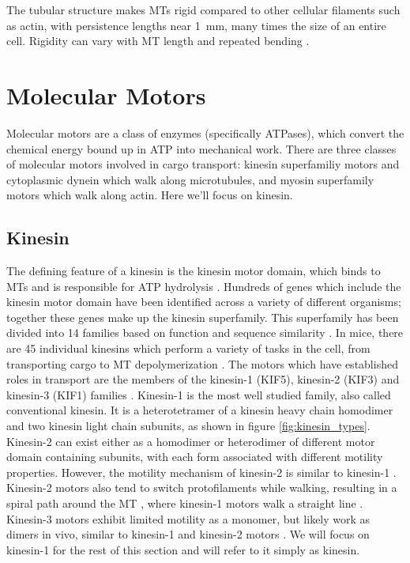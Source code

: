 The tubular structure makes MTs rigid compared to other cellular filaments such as actin, with persistence lengths near \SI{1}{\milli\meter}, many times the size of an entire cell. Rigidity can vary with MT length and repeated bending \cite{Schaedel2015}.

\section{Molecular Motors}

Molecular motors are a class of enzymes (specifically ATPases), which convert the chemical energy bound up in ATP into mechanical work. There are three classes of molecular motors involved in cargo transport: kinesin superfamiliy motors and cytoplasmic dynein which walk along microtubules, and myosin superfamily motors which walk along actin. Here we'll focus on kinesin.

\subsection{Kinesin} \label{sec:kinesin}

The defining feature of a kinesin is the kinesin motor domain, which binds to MTs and is responsible for ATP hydrolysis \cite{Verhey2011}. Hundreds of genes which include the kinesin motor domain have been identified across a variety of different organisms; together these genes make up the kinesin superfamily. This superfamily has been divided into 14 families based on function and sequence similarity \cite{Lawrence2004}. In mice, there are 45 individual kinesins which perform a variety of tasks in the cell, from transporting cargo to MT depolymerization \cite{Hirokawa2009}. The motors which have established roles in transport are the members of the kinesin-1 (KIF5), kinesin-2 (KIF3) and kinesin-3 (KIF1) families \cite{Verhey2011}. Kinesin-1 is the most well studied family, also called conventional kinesin. It is a heterotetramer of a kinesin heavy chain homodimer and two kinesin light chain subunits, as shown in figure \ref{fig:kinesin_types}. Kinesin-2 can exist either as a homodimer or heterodimer of different motor domain containing subunits, with each form associated with different motility properties. However, the motility mechanism of kinesin-2 is similar to kinesin-1 \cite{Andreasson2015}. Kinesin-2 motors also tend to switch protofilaments while walking, resulting in a spiral path around the MT \cite{Brunnbauer2012}, where kinesin-1 motors walk a straight line \cite{Ray1993}. Kinesin-3 motors exhibit limited motility as a monomer, but likely work as dimers in vivo, similar to kinesin-1 and kinesin-2 motors \cite{Siddiqui2017}. We will focus on kinesin-1 for the rest of this section and will refer to it simply as kinesin.

